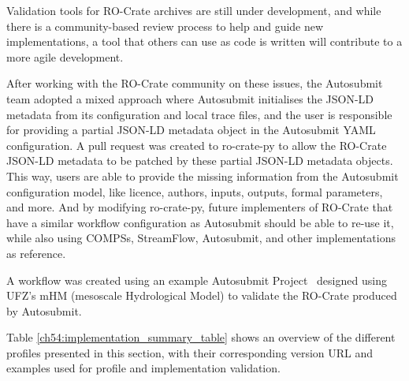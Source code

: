 Validation tools for RO-Crate archives are still under development, and while there is a community-based review process to help and guide new implementations, a tool that others can use as code is written will contribute to a more agile development.

After working with the RO-Crate community on these issues, the Autosubmit team adopted a mixed approach where Autosubmit initialises the JSON-LD metadata from its configuration and local trace files, and the user is responsible for providing a partial JSON-LD metadata object in the Autosubmit YAML configuration.
A pull request was created to ro-crate-py to allow the RO-Crate JSON-LD metadata to be patched by these partial JSON-LD metadata objects.
This way, users are able to provide the missing information from the Autosubmit configuration model, like licence, authors, inputs, outputs, formal parameters, and more.
And by modifying ro-crate-py, future implementers of RO-Crate that have a similar workflow configuration as Autosubmit should be able to re-use it, while also using COMPSs, StreamFlow, Autosubmit, and other implementations as reference.

A workflow was created using an example Autosubmit Project~\cite{Kinoshita 2023} designed using UFZ's mHM (mesoscale Hydrological Model)
\cite{Samaniego 2010,Kumar 2013} to validate the RO-Crate produced by Autosubmit.

Table \vref{ch54:implementation_summary_table} shows an overview of the different profiles presented in this section, with their corresponding version URL and examples used for profile and implementation validation.

